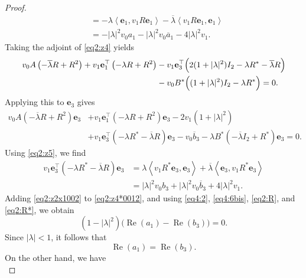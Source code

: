 \documentclass[12pt, reqno]{amsart}
\theoremstyle{definition}
\theoremstyle{remark}
\numberwithin{equation}{section}
\begin{document}
\begin{proof}
\begin{align}
		&= -\lambda \left\langle \mathbf{e}_1, v_1 R \mathbf{e}_1 \right\rangle - \overline{\lambda} \left\langle v_1 R \mathbf{e}_1, \mathbf{e}_1 \right\rangle \nonumber\\
		&= -|\lambda|^2 v_0 a_1 - |\lambda|^2 v_0 \overline{a}_1 - 4|\lambda|^2 v_1. \label{eq2:R}
	\end{align}
	Taking the adjoint of \eqref{eq2:z4} yields
	\begin{align}
		v_0 A \left(  -\overline{\lambda} R + R^2 \right)   + v_1 \mathbf{e}_1^\top \left(  -\lambda R + R^{2} \right) & - v_1 \mathbf{e}_3^\top \Bigl( 2(1+|\lambda|^2)I_2 - \lambda R^* - \overline{\lambda}R \Bigr)  \nonumber \\
		& - v_0 B^* \Bigl( (1+|\lambda|^2)I_2 - \lambda R^* \Bigr)  = 0. \label{eq2:z4*}
	\end{align}
	Applying this to $\mathbf{e}_3$ gives
	\begin{align}
		v_0 A \left(-\overline{\lambda} R + R^2 \right)  \mathbf{e}_3 & + v_1 \mathbf{e}_1^\top \left(-\lambda R + R^{2} \right) \mathbf{e}_3  - 2v_1 (1+|\lambda|^2)  \nonumber\\
		& + v_1 \mathbf{e}_3^\top \left(  -\lambda R^* - \overline{\lambda}R\right)  \mathbf{e}_3- v_0 \overline{b}_3 - \lambda B^*\left(-\overline{\lambda}I_2 + R^* \right)  \mathbf{e}_3 = 0. \label{eq2:z4*0012}
	\end{align}
	Using \eqref{eq2:z5}, we find
	\begin{align}
		v_1 \mathbf{e}_3^\top \left(-\lambda R^* - \overline{\lambda}R\right)  \mathbf{e}_3 
		&= \lambda \left\langle v_1 R^* \mathbf{e}_3, \mathbf{e}_3 \right\rangle + \overline{\lambda} \left\langle \mathbf{e}_3, v_1 R^* \mathbf{e}_3 \right\rangle \nonumber\\
		&= |\lambda|^2 v_0 b_3 + |\lambda|^2 v_0 \overline{b}_3 + 4|\lambda|^2 v_1. \label{eq2:R*}
	\end{align}
	Adding \eqref{eq2:z2x1002} to \eqref{eq2:z4*0012}, and using \eqref{eq4:2}, \eqref{eq4:6bis}, \eqref{eq2:R}, and \eqref{eq2:R*}, we obtain
	\begin{equation}\label{key_real}
		(1-|\lambda|^2)\bigl(\operatorname{Re}(a_1) - \operatorname{Re}(b_3)\bigr) = 0.	
	\end{equation}
	Since $|\lambda| < 1$, it follows that
	\begin{equation}\label{key_equal}
		\operatorname{Re}(a_1) = \operatorname{Re}(b_3).	
	\end{equation}
	On the other hand, we have 
	\begin{equation}\label{eq_tr}

\end{equation}
\end{proof}
\end{document}
